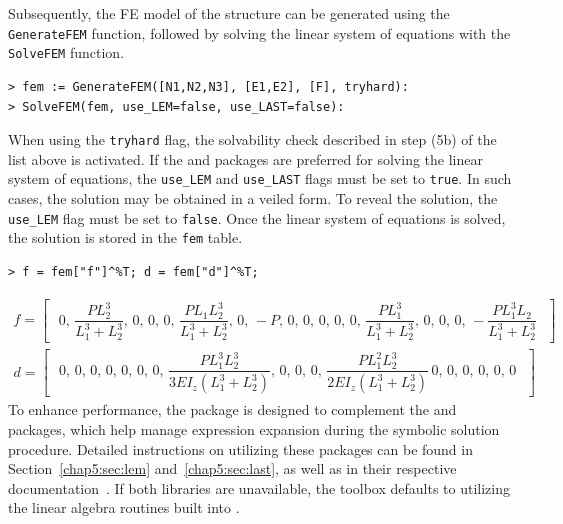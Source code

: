 Subsequently, the \ac{FE} model of the structure can be generated using the \texttt{GenerateFEM} function, followed by solving the linear system of equations with the \texttt{SolveFEM} function.
%
\begin{verbatim}
> fem := GenerateFEM([N1,N2,N3], [E1,E2], [F], tryhard):
> SolveFEM(fem, use_LEM=false, use_LAST=false):
\end{verbatim}
%
When using the \texttt{tryhard} flag, the solvability check described in step (5b) of the list above is activated. If the \LEM{} and \LAST{} packages are preferred for solving the linear system of equations, the \texttt{use_LEM} and \texttt{use_LAST} flags must be set to \texttt{true}. In such cases, the solution may be obtained in a veiled form. To reveal the solution, the \texttt{use_LEM} flag must be set to \texttt{false}. Once the linear system of equations is solved, the solution is stored in the \texttt{fem} table.
%
\begin{verbatim}
> f = fem["f"]^%T; d = fem["d"]^%T;
\end{verbatim}
\begin{equation*}
  \begin{matrix}
    f = \left[\,\begin{matrix}
      \, 0, \, \dfrac{PL_2^3}{L_1^3+L_2^3}, \, 0, \, 0, \, 0, \, \dfrac{PL_1L_2^3}{L_1^3+L_2^3}, \, 0, \, -P, \, 0, \, 0, \, 0, \, 0, \, 0, \, \dfrac{PL_1^3}{L_1^3+L_2^3}, \, 0, \, 0, \, 0, \, -\dfrac{PL_1^3L_2}{L_1^3+L_2^3} \,
    \end{matrix}\,\right] \\[1.5em]
    d = \left[\,\begin{matrix}
      \, 0, \, 0, \, 0, \, 0, \, 0, \, 0, \, 0, \, \dfrac{PL_1^3L_2^3}{3EI_z(L_1^3+L_2^3)}, \, 0, \, 0, \, 0, \, \dfrac{PL_1^2L_2^3}{2EI_z(L_1^3+L_2^3)} \, 0, \, 0, \, 0, \, 0, \, 0, \, 0 \,
    \end{matrix}\,\right]
  \end{matrix}
\end{equation*}
%
To enhance performance, the \TrussMe{} package is designed to complement the \LEM{} and \LAST{} packages, which help manage expression expansion during the symbolic solution procedure. Detailed instructions on utilizing these packages can be found in Section~\ref{chap5:sec:lem} and~\ref{chap5:sec:last}, as well as in their respective documentation~\cite{lem2023source, last}. If both libraries are unavailable, the toolbox defaults to utilizing the linear algebra routines built into \Maple{}.

